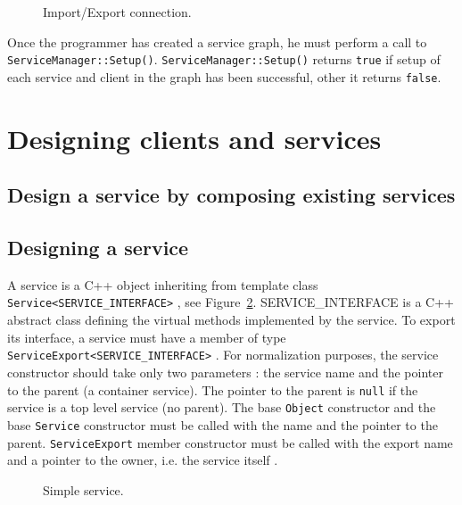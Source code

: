 \begin{figure}[h]
  \begin{center}
    
    \caption{\label{fig:connection} Import/Export connection.}
  \end{center}
\end{figure}

Once \hfill the \hfill programmer \hfill has \hfill created \hfill a \hfill service \hfill graph, \hfill he \hfill must \hfill perform \hfill a \hfill call \hfill to \hfill \texttt{ServiceManager::Setup()}.
\texttt{ServiceManager::Setup()} returns \texttt{true} if setup of each service and client in the graph has been successful, other it returns \texttt{false}.

\section{Designing clients and services}
\label{designing_clients_and_services}

\subsection{Design a service by composing existing services}

\subsection{Designing a service}

A service is a C++ object inheriting from template class \texttt{Service<SERVICE\_INTERFACE>} , see Figure~\ref{fig:simple_service}.
SERVICE\_INTERFACE is a C++ abstract class defining the virtual methods implemented by the service.
To export its interface, a service must have a member of type \texttt{ServiceExport<SERVICE\_INTERFACE>} .
For normalization purposes, the service constructor should take only two parameters : the service name and the pointer to the parent (a container service).
The pointer to the parent is \texttt{null} if the service is a top level service (no parent).
The base \texttt{Object} constructor  and the base \texttt{Service} constructor  must be called with the name and the pointer to the parent.
\texttt{ServiceExport} member constructor must be called with the export name and a pointer to the owner, i.e. the service itself .

\begin{figure}[h]
  \begin{center}
    
    \caption{\label{fig:simple_service} Simple service.}
  \end{center}
\end{figure}


